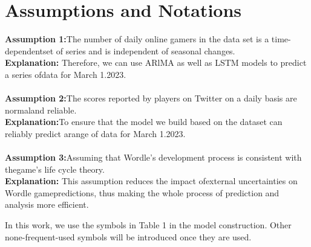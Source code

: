 \documentclass[12pt]{ctexart}
\begin{document}
\section{Assumptions and Notations}
\vspace{0pt}

\textbf{Assumption 1:}The number of daily online gamers in the data set is a time-dependentset of series and is independent of seasonal changes.
\\
\textbf{Explanation:} Therefore, we can use ARlMA as well as LSTM models to predict a series ofdata for March 1.2023.
\\
\\
\textbf{Assumption 2:}The scores reported by players on Twitter on a daily basis are normaland reliable.
\\
\textbf{Explanation:}To ensure that the model we build based on the dataset can reliably predict arange of data for March 1.2023.
\\
\\
\textbf{Assumption 3:}Assuming that Wordle's development process is consistent with thegame's life cycle theory.
\\
\textbf{Explanation:} This assumption reduces the impact ofexternal uncertainties on Wordle gamepredictions, thus making the whole process of prediction and analysis more efficient.

In this work, we use the symbols in Table 1 in the model construction. Other none-frequent-used symbols will be introduced once they are used.


\end{document}
